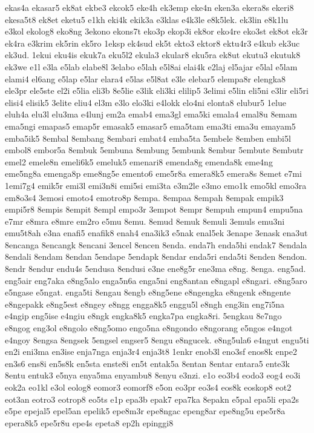 {ekas4a ekasar5 ek8at ekbe3 ekcok5 eke4h ek3emp eke4n eken3a ekera8s ekeri8
ekesa5t8 ek8et eketu5 e1kh eki4k ekik3a e3klas e4k3le e8k5lek. ek3lin
e8k1lu e3kol ekolog8 eko8ng 3ekono ekons7t eko3p ekop3i ek8or eko4re
eko3st ek8ot ek3r ek4ra e3krim ek5rin ek5ro 1eksp ek4sud ek5t ekto3 ektor8
ektu4r3 e4kub ek3uc ek3ud. 1ekui eku4is ekuk7a eku5l2 ekula3 ekular8
eku5ra ek8ut ekutu3 ekutuk8 ek3we e1l e3la e5lab elabe8l 3elabo e5lah
e5l8ai elai4k e2laj el5ajar e5lal e5lam elami4 el6ang e5lap e5lar elara4
e5las e5l8at e3le elebar5 elempa8r elengka8 ele3pr ele5ste el2i e5lia
eli3b 8e5lie e3lik eli3ki elilip5 3elimi e5lin eli5ni e3lir eli5ri elisi4
elisik5 3elite eliu4 el3m e3lo elo3ki e4lokk elo4ni elonta8 elubur5 1elue
eluh4a elu3l elu3ma e4lunj em2a emab4 ema3gl ema5ki emala4 emal8u 8emam
ema5ngi emapas5 emap5r emasak5 emasar5 ema5tam ema3ti ema3u emayam5
emba5ik5 8embal 8embang 8embari embat4 emba5ta 5embele 8emben embi5l
embol8 embor5a 8embuk 5embuna 8embung 5embunk 8embur 5embute 8embutr emel2
emele8n emeli6k5 emeluk5 emenari8 emenda8g emenda8k eme4ng eme5ng8a
emenga8p eme8ng5e emento6 eme5r8a emera8k5 emera8s 8emet e7mi 1emi7g4
emik5r emi3l emi3n8i emi5si emi3ta e3m2le e3mo emo1k emo5kl emo3ra em8o3s4
3emosi emoto4 emotro8p 8empa. 8empaa 8empah 8empak empik3 empi5r8 8empis
8empit 8empl empo3r 3empot 8empr 8empuh empun4 empu5na e7mr e8mra e8mre
em2ro e5mu 8emu. 8emud 8emuk 8emuli 3emuls emu3ni emu5t8ah e3na enafi5
enafik8 enah4 ena3ik3 e5nak enal5ek 3enape 3enask ena3ut 8encanga 8encangk
8encani 3encel 8encen 8enda. enda7h enda5hi endak7 8endala 8endali 8endam
8endan 5endape 5endapk 8endar enda5ri enda5ti 8enden 8endon. 8endr 8endur
endu4s 5endusa 8endusi e3ne ene8g5r ene3ma e8ng. 8enga. eng5ad. eng5air
eng7aka e8ng5alo enga5n6a enga5ni eng8antan e8ngapl e8ngari. e8ng5aro
e5ngase e5ngat. enga5ti 8engau 8engb e8ng5ene e8ngengka e8ngenk e8ngente
e8ngepakk e8ng5est e8ngey e8ngg engga8k5 enggu5l e8ngh eng3in eng7i5na
e4ngip eng5ise e4ngiu e8ngk engka8k5 engka7pa engka8ri. 5engkau 8e7ngo
e8ngog eng3ol e8ngolo e8ng5omo engo5na e8ngondo e8ngorang e5ngos e4ngot
e4ngoy 8engsa 8engsek 5engsel engser5 8engu e8ngucek. e8ng5ula6 e4ngut
engu5ti en2i eni3ma en3ise enja7nga enja3r4 enja3t8 1enkr enob3l eno3sf
enos8k enpe2 en3s6 ens8i en5s8k en5sta enste8i en5t entak5a 8entan 8entar
entara5 ente3k 8entu entuk3 e5nya enya5ma enyambu8 8enyu e3nzi. e1o eo3b4
eodo3 eog4 eo3i eok2a eo1kl e3ol eolog8 eomor3 eomorf8 e5on eo3pr eo3s4
eos8k eoskop8 eot2 eot3an eotro3 eotrop8 eo5ts e1p epa3b epak7 epa7ka
8epakn e5pal epa5li epa2s e5pe epejal5 epel5an epelik5 epe8m3r epe8ngac
epeng8ar epe8ng5u epe5r8a epera8k5 epe5r8u epe4s epeta8 ep2h epinggi8
}
